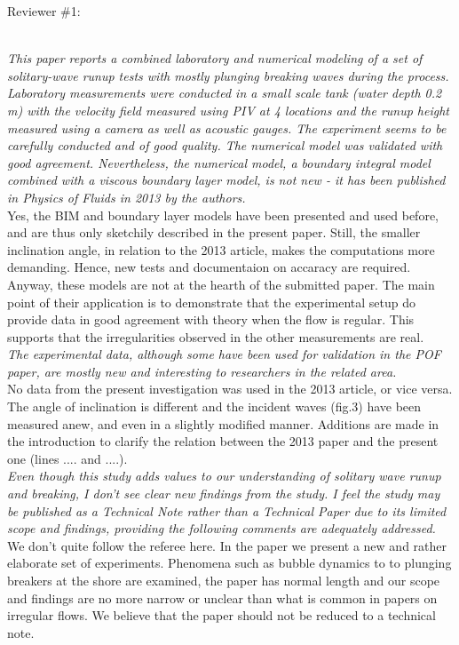 
\newcommand{\refpoint}[1]{\ \vspace{0.3cm}\\ {\em #1}\  \vspace{0.3cm}\\ }
\newcommand{\todo}[1]{\ \\ {\bf To do: #1}}
Reviewer \#1:

\refpoint{This paper reports a combined laboratory and numerical modeling of a set of solitary-wave runup tests 
with mostly plunging breaking waves during the process.  Laboratory measurements were conducted in a small scale tank 
(water depth 0.2 m) with the velocity field measured using PIV at 4 locations and the runup height measured using a 
camera as well as acoustic gauges.  The experiment seems to be carefully conducted and of good quality.  The numerical
 model was validated with good agreement.  Nevertheless, the numerical model, a boundary integral model combined with a
 viscous boundary layer model, is not new - it has been published in Physics of Fluids in 2013 by the authors.}
Yes, the BIM and boundary layer models have been presented and used before, and are thus only sketchily described 
in the present paper. Still, the smaller inclination angle, in relation to the 2013 article, makes the 
computations more demanding. Hence, new tests and documentaion on accaracy are required.\\
Anyway, these models are not at the hearth of the submitted paper.
The main point of their application  is to demonstrate that the experimental setup do
provide data in good agreement with theory when the flow is regular. This supports that the irregularities
observed in the other measurements are real.   
 \refpoint{The 
experimental data, although some have been used for validation in the POF paper, are mostly new and interesting to 
researchers in the related area.}
No data from the present investigation was used in the 2013 article, or vice versa. The angle of inclination
is different and the incident waves (fig.3) have been measured anew, and even in a slightly modified manner. 
Additions are made in the introduction to clarify the relation between the 2013 paper and the present one
(lines ....  and ....).
\refpoint{ Even though this study adds values to our understanding of solitary wave runup and 
breaking, I don't see clear new findings from the study.
 I feel the study may be published as a Technical Note rather than a Technical Paper due to its limited scope and 
findings, providing the following comments are adequately addressed.}
We don't quite follow the referee here. In the paper we present a new and rather elaborate set of experiments.
Phenomena such as bubble dynamics to to plunging breakers at the shore are examined, 
the paper has normal length and our scope and findings are no more narrow or unclear than what is common in 
papers on irregular flows.
We believe that the paper should not be reduced to a technical note. 

